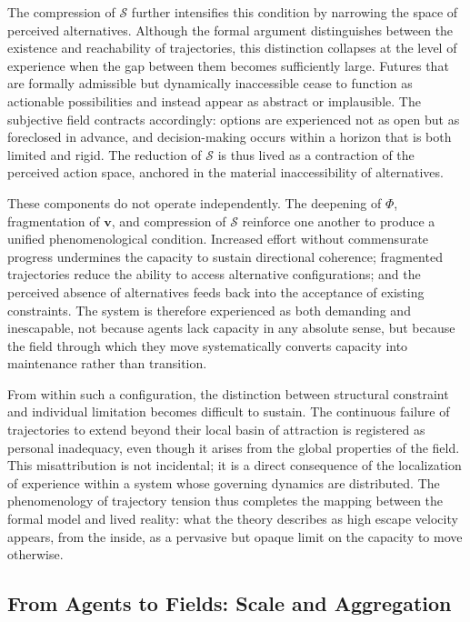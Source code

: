 \documentclass[11pt, a4paper]{article}
\begin{document}
The compression of $\mathcal{S}$ further intensifies this condition by narrowing the space of perceived alternatives. Although the formal argument distinguishes between the existence and reachability of trajectories, this distinction collapses at the level of experience when the gap between them becomes sufficiently large. Futures that are formally admissible but dynamically inaccessible cease to function as actionable possibilities and instead appear as abstract or implausible. The subjective field contracts accordingly: options are experienced not as open but as foreclosed in advance, and decision-making occurs within a horizon that is both limited and rigid. The reduction of $\mathcal{S}$ is thus lived as a contraction of the perceived action space, anchored in the material inaccessibility of alternatives.

These components do not operate independently. The deepening of $\Phi$, fragmentation of $\mathbf{v}$, and compression of $\mathcal{S}$ reinforce one another to produce a unified phenomenological condition. Increased effort without commensurate progress undermines the capacity to sustain directional coherence; fragmented trajectories reduce the ability to access alternative configurations; and the perceived absence of alternatives feeds back into the acceptance of existing constraints. The system is therefore experienced as both demanding and inescapable, not because agents lack capacity in any absolute sense, but because the field through which they move systematically converts capacity into maintenance rather than transition.

From within such a configuration, the distinction between structural constraint and individual limitation becomes difficult to sustain. The continuous failure of trajectories to extend beyond their local basin of attraction is registered as personal inadequacy, even though it arises from the global properties of the field. This misattribution is not incidental; it is a direct consequence of the localization of experience within a system whose governing dynamics are distributed. The phenomenology of trajectory tension thus completes the mapping between the formal model and lived reality: what the theory describes as high escape velocity appears, from the inside, as a pervasive but opaque limit on the capacity to move otherwise.

\subsection{From Agents to Fields: Scale and Aggregation}
\end{document}
